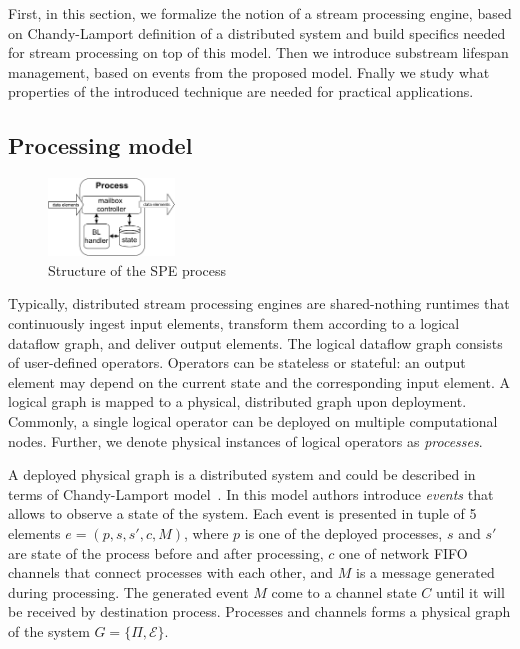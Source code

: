 \label{fs-acker-preliminaries}

First, in this section, we formalize the notion of a stream processing engine, based on Chandy-Lamport definition of a distributed system and build specifics needed for stream processing on top of this model. Then we introduce substream lifespan management, based on events from the proposed model. Fnally we study what properties of the introduced    technique are needed for practical applications.

\subsection{Processing model}

\begin{figure}[htbp]
  \centering
  \includegraphics[width=0.30\textwidth]{pics/process-scheme.pdf}
  \caption{Structure of the SPE process}
  \label{fig:spe_process}
\end{figure}

Typically, distributed stream processing engines are shared-nothing runtimes that continuously ingest input elements, transform them according to a logical dataflow graph, and deliver output elements. The logical dataflow graph consists of user-defined operators. Operators can be stateless or stateful: an output element may depend on the current state and the corresponding input element. A logical graph is mapped to a physical, distributed graph upon deployment. Commonly, a single logical operator can be deployed on multiple computational nodes. Further, we denote physical instances of logical operators as {\em processes}.

A deployed physical graph is a distributed system and could be described in terms of Chandy-Lamport model~\cite{lamport}. In this model authors introduce \textit{events} that allows to observe a state of the system. Each event is presented in tuple of 5 elements $e = (p, s, s', c, M)$, where $p$ is one of the deployed processes, $s$ and $s'$ are state of the process before and after processing, $c$ one of network FIFO channels that connect processes with each other, and $M$ is a message generated during processing. The generated event $M$ come to a channel state $C$ until it will be received by destination process. Processes and channels forms a physical graph of the system $G=\{\Pi,\mathcal{E}\}$.

